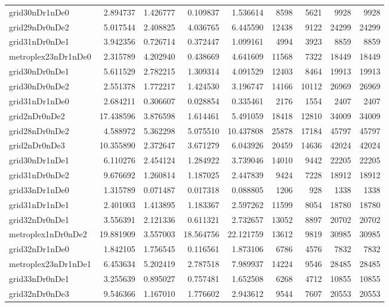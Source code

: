 \begin{longtable}{|l|r|r|r|r|r|r|r|r|}
grid30nDr1nDe0 & 2.894737 & 1.426777 & 0.109837 & 1.536614 & 8598 & 5621 & 9928 & 9928 \\
grid29nDr0nDe2 & 5.017544 & 2.408825 & 4.036765 & 6.445590 & 12438 & 9122 & 24299 & 24299 \\
grid31nDr0nDe1 & 3.942356 & 0.726714 & 0.372447 & 1.099161 & 4994 & 3923 & 8859 & 8859 \\
metroplex23nDr1nDe0 & 2.315789 & 4.202940 & 0.438669 & 4.641609 & 11568 & 7322 & 18449 & 18449 \\
grid30nDr0nDe1 & 5.611529 & 2.782215 & 1.309314 & 4.091529 & 12403 & 8464 & 19913 & 19913 \\
grid30nDr0nDe2 & 2.551378 & 1.772217 & 1.424530 & 3.196747 & 14166 & 10112 & 26969 & 26969 \\
grid31nDr1nDe0 & 2.684211 & 0.306607 & 0.028854 & 0.335461 & 2176 & 1554 & 2407 & 2407 \\
grid2nDr0nDe2 & 17.438596 & 3.876598 & 1.614461 & 5.491059 & 18418 & 12810 & 34009 & 34009 \\
grid28nDr0nDe2 & 4.588972 & 5.362298 & 5.075510 & 10.437808 & 25878 & 17184 & 45797 & 45797 \\
grid2nDr0nDe3 & 10.355890 & 2.372647 & 3.671279 & 6.043926 & 20459 & 14636 & 42024 & 42024 \\
grid30nDr1nDe1 & 6.110276 & 2.454124 & 1.284922 & 3.739046 & 14010 & 9442 & 22205 & 22205 \\
grid31nDr0nDe2 & 9.676692 & 1.260814 & 1.187025 & 2.447839 & 9424 & 7228 & 18912 & 18912 \\
grid33nDr1nDe0 & 1.315789 & 0.071487 & 0.017318 & 0.088805 & 1206 & 928 & 1338 & 1338 \\
grid31nDr1nDe1 & 2.401003 & 1.413895 & 1.183367 & 2.597262 & 11599 & 8054 & 18780 & 18780 \\
grid32nDr0nDe1 & 3.556391 & 2.121336 & 0.611321 & 2.732657 & 13052 & 8897 & 20702 & 20702 \\
metroplex1nDr0nDe2 & 19.881909 & 3.557003 & 18.564756 & 22.121759 & 13612 & 9819 & 30985 & 30985 \\
grid32nDr1nDe0 & 1.842105 & 1.756545 & 0.116561 & 1.873106 & 6786 & 4576 & 7832 & 7832 \\
metroplex23nDr1nDe1 & 6.453634 & 5.202419 & 2.787518 & 7.989937 & 14224 & 9546 & 28485 & 28485 \\
grid33nDr0nDe1 & 3.255639 & 0.895027 & 0.757481 & 1.652508 & 6268 & 4712 & 10855 & 10855 \\
grid32nDr0nDe3 & 9.546366 & 1.167010 & 1.776602 & 2.943612 & 9544 & 7607 & 20553 & 20553 \\

\end{longtable}
